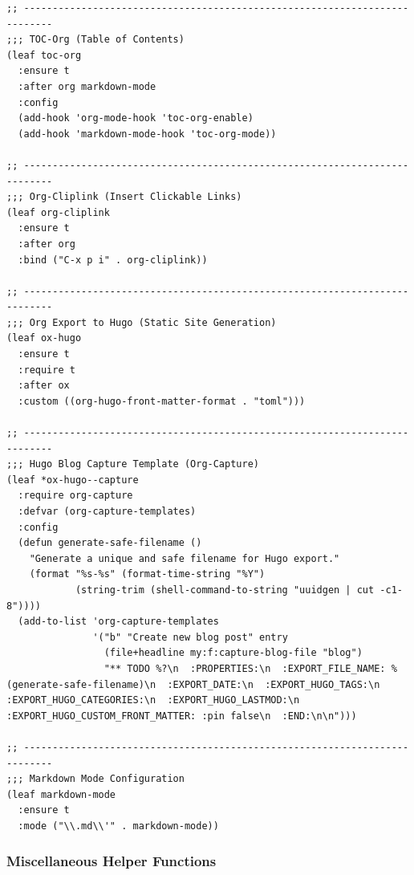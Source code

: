 \documentclass[11pt]{article}
\begin{document}
\begin{verbatim}
;; ---------------------------------------------------------------------------
;;; TOC-Org (Table of Contents)
(leaf toc-org
  :ensure t
  :after org markdown-mode
  :config
  (add-hook 'org-mode-hook 'toc-org-enable)
  (add-hook 'markdown-mode-hook 'toc-org-mode))

;; ---------------------------------------------------------------------------
;;; Org-Cliplink (Insert Clickable Links)
(leaf org-cliplink
  :ensure t
  :after org
  :bind ("C-x p i" . org-cliplink))

;; ---------------------------------------------------------------------------
;;; Org Export to Hugo (Static Site Generation)
(leaf ox-hugo
  :ensure t
  :require t
  :after ox
  :custom ((org-hugo-front-matter-format . "toml")))

;; ---------------------------------------------------------------------------
;;; Hugo Blog Capture Template (Org-Capture)
(leaf *ox-hugo--capture
  :require org-capture
  :defvar (org-capture-templates)
  :config
  (defun generate-safe-filename ()
    "Generate a unique and safe filename for Hugo export."
    (format "%s-%s" (format-time-string "%Y")
            (string-trim (shell-command-to-string "uuidgen | cut -c1-8"))))
  (add-to-list 'org-capture-templates
               '("b" "Create new blog post" entry
                 (file+headline my:f:capture-blog-file "blog")
                 "** TODO %?\n  :PROPERTIES:\n  :EXPORT_FILE_NAME: %(generate-safe-filename)\n  :EXPORT_DATE:\n  :EXPORT_HUGO_TAGS:\n  :EXPORT_HUGO_CATEGORIES:\n  :EXPORT_HUGO_LASTMOD:\n  :EXPORT_HUGO_CUSTOM_FRONT_MATTER: :pin false\n  :END:\n\n")))

;; ---------------------------------------------------------------------------
;;; Markdown Mode Configuration
(leaf markdown-mode
  :ensure t
  :mode ("\\.md\\'" . markdown-mode))
\end{verbatim}
\subsubsection{Miscellaneous Helper Functions}
\label{sec:org9b8942d}
\end{document}
